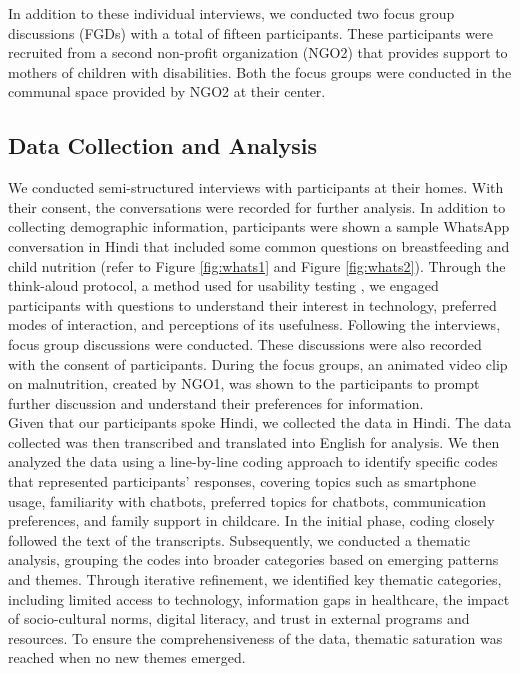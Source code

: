 In addition to these individual interviews, we conducted two focus group discussions (FGDs) with a total of fifteen participants. These participants were recruited from a second non-profit organization (NGO2) that provides support to mothers of children with disabilities. Both the focus groups were conducted in the communal space provided by NGO2 at their center. 


\subsection{Data Collection and Analysis}
We conducted semi-structured interviews with participants at their homes. With their consent, the conversations were recorded for further analysis. In addition to collecting demographic information, participants were shown a sample WhatsApp conversation in Hindi that included some common questions on breastfeeding and child nutrition (refer to Figure \ref{fig:whats1} and Figure \ref{fig:whats2}). Through the think-aloud protocol, a method used for usability testing \cite{b23}, we engaged participants with questions to understand their interest in technology, preferred modes of interaction, and perceptions of its usefulness.
Following the interviews, focus group discussions were conducted. These discussions were also recorded with the consent of participants. During the focus groups, an animated video clip on malnutrition, created by NGO1, was shown to the participants to prompt further discussion and understand their preferences for information. \\
Given that our participants spoke Hindi, we collected the data in Hindi. The data collected was then transcribed and translated into English for analysis. We then analyzed the data using a line-by-line coding approach to identify specific codes that represented participants’ responses, covering topics such as smartphone usage, familiarity with chatbots, preferred topics for chatbots, communication preferences, and family support in childcare. In the initial phase, coding closely followed the text of the transcripts.
Subsequently, we conducted a thematic analysis, grouping the codes into broader categories based on emerging patterns and themes. Through iterative refinement, we identified key thematic categories, including limited access to technology, information gaps in healthcare, the impact of socio-cultural norms, digital literacy, and trust in external programs and resources. To ensure the comprehensiveness of the data, thematic saturation was reached when no new themes emerged.


